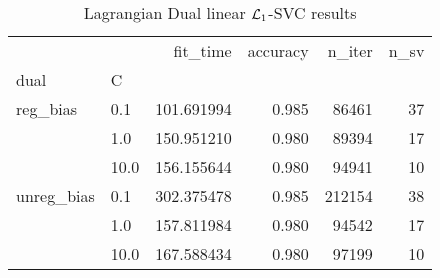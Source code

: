 \begin{table}[H]
\centering
\caption{Lagrangian Dual linear $\protect \mathcal{L}_1$-SVC results}
\label{linear_lagrangian_dual_l1_svc_cv_results}
\begin{tabular}{llrrrr}
\toprule
           &      &    fit\_time &  accuracy &  n\_iter &  n\_sv \\
dual & C &             &           &         &       \\
\midrule
reg\_bias & 0.1  &  101.691994 &     0.985 &   86461 &    37 \\
           & 1.0  &  150.951210 &     0.980 &   89394 &    17 \\
           & 10.0 &  156.155644 &     0.980 &   94941 &    10 \\
unreg\_bias & 0.1  &  302.375478 &     0.985 &  212154 &    38 \\
           & 1.0  &  157.811984 &     0.980 &   94542 &    17 \\
           & 10.0 &  167.588434 &     0.980 &   97199 &    10 \\
\bottomrule
\end{tabular}
\end{table}
